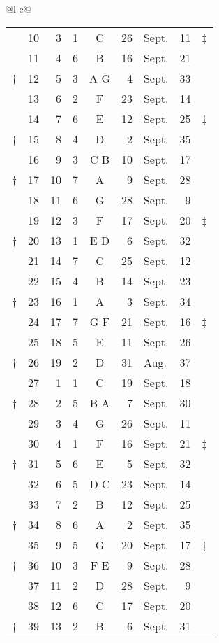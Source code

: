 \begin{tabular}{@{}l c@{}}
\begin{tabular}[t]{@{}r rrcc r@{~}l r l@{}}
~ & 10 &  3 &  1 &  C  & 26 & Sept. & 11 & ‡ \\
~ & 11 &  4 &  6 &  B  & 16 & Sept. & 21 \\
† & 12 &  5 &  3 & A G &  4 & Sept. & 33 \\
\cmidrule{2-8}
~ & 13 &  6 &  2 &  F  & 23 & Sept. & 14 \\
~ & 14 &  7 &  6 &  E  & 12 & Sept. & 25 & ‡ \\
† & 15 &  8 &  4 &  D  &  2 & Sept. & 35 \\
~ & 16 &  9 &  3 & C B & 10 & Sept. & 17 \\
\cmidrule{2-8}
† & 17 & 10 &  7 &  A  &  9 & Sept. & 28 \\
~ & 18 & 11 &  6 &  G  & 28 & Sept. &  9 & ~\\
~ & 19 & 12 &  3 &  F  & 17 & Sept. & 20 & ‡ \\
† & 20 & 13 &  1 & E D &  6 & Sept. & 32 \\
\cmidrule{2-8}
~ & 21 & 14 &  7 &  C  & 25 & Sept. & 12 \\
~ & 22 & 15 &  4 &  B  & 14 & Sept. & 23 \\
† & 23 & 16 &  1 &  A  &  3 & Sept. & 34 \\
~ & 24 & 17 &  7 & G F & 21 & Sept. & 16 & ‡ \\
\cmidrule{2-8}
~ & 25 & 18 &  5 &  E  & 11 & Sept. & 26 \\
† & 26 & 19 &  2 &  D  & 31 & Aug.  & 37 & ~ \\
~ & 27 &  1 &  1 &  C  & 19 & Sept. & 18 \\
† & 28 &  2 &  5 & B A &  7 & Sept. & 30 \\
\cmidrule{2-8}
~ & 29 &  3 &  4 &  G  & 26 & Sept. & 11 \\
~ & 30 &  4 &  1 &  F  & 16 & Sept. & 21 & ‡ \\
† & 31 &  5 &  6 &  E  &  5 & Sept. & 32 \\
~ & 32 &  6 &  5 & D C & 23 & Sept. & 14 \\
\cmidrule{2-8}
~ & 33 &  7 &  2 &  B  & 12 & Sept. & 25 \\
† & 34 &  8 &  6 &  A  &  2 & Sept. & 35 \\
~ & 35 &  9 &  5 &  G  & 20 & Sept. & 17 & ‡ \\
† & 36 & 10 &  3 & F E &  9 & Sept. & 28 \\
\cmidrule{2-8}
~ & 37 & 11 &  2 &  D  & 28 & Sept. &  9 \\
~ & 38 & 12 &  6 &  C  & 17 & Sept. & 20 \\
† & 39 & 13 &  2 &  B  &  6 & Sept. & 31 \\

\end{tabular}
\end{tabular}
